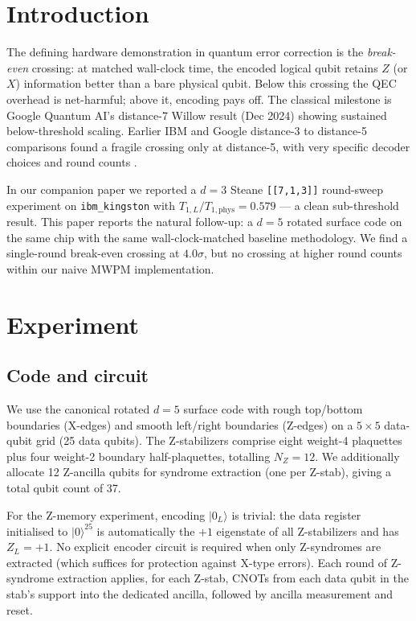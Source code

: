 \documentclass[11pt,letterpaper]{article}
\begin{document}
\section{Introduction}

The defining hardware demonstration in quantum error correction is the \emph{break-even} crossing: at matched wall-clock time, the encoded logical qubit retains $Z$ (or $X$) information better than a bare physical qubit. Below this crossing the QEC overhead is net-harmful; above it, encoding pays off. The classical milestone is Google Quantum AI's distance-7 Willow result (Dec 2024) \cite{willow} showing sustained below-threshold scaling. Earlier IBM and Google distance-3 to distance-5 comparisons found a fragile crossing only at distance-5, with very specific decoder choices and round counts \cite{willow_precursor}.

In our companion paper \cite{steane_paper} we reported a $d = 3$ Steane \texttt{[[7,1,3]]} round-sweep experiment on \texttt{ibm\_kingston} with $T_{1,L} / T_{1,\mathrm{phys}} = 0.579$ --- a clean sub-threshold result. This paper reports the natural follow-up: a $d = 5$ rotated surface code on the same chip with the same wall-clock-matched baseline methodology. We find a single-round break-even crossing at $4.0\sigma$, but no crossing at higher round counts within our naive MWPM implementation.

\section{Experiment}

\subsection{Code and circuit}

We use the canonical rotated $d = 5$ surface code with rough top/bottom boundaries (X-edges) and smooth left/right boundaries (Z-edges) on a $5 \times 5$ data-qubit grid (25 data qubits). The Z-stabilizers comprise eight weight-4 plaquettes plus four weight-2 boundary half-plaquettes, totalling $N_Z = 12$. We additionally allocate 12 Z-ancilla qubits for syndrome extraction (one per Z-stab), giving a total qubit count of 37.

For the Z-memory experiment, encoding $|0_L\rangle$ is trivial: the data register initialised to $|0\rangle^{25}$ is automatically the $+1$ eigenstate of all Z-stabilizers and has $Z_L = +1$. No explicit encoder circuit is required when only Z-syndromes are extracted (which suffices for protection against X-type errors). Each round of Z-syndrome extraction applies, for each Z-stab, CNOTs from each data qubit in the stab's support into the dedicated ancilla, followed by ancilla measurement and reset.
\end{document}
